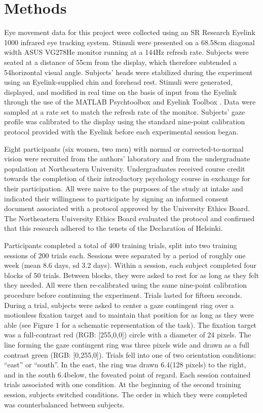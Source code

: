 \section{Methods}
Eye movement data for this project were collected using an SR Research Eyelink 1000 infrared eye tracking system. Stimuli were presented on a 68.58cm diagonal width ASUS VG278He monitor running at a 144Hz refresh rate. Subjects were seated at a distance of 55cm from the display, which therefore subtended a 54\degree horizontal visual angle. Subjects' heads were stabilized during the experiment using an Eyelink-supplied chin and forehead rest. Stimuli were generated, displayed, and modified in real time on the basis of input from the Eyelink through the use of the MATLAB Psychtoolbox \citep{brainard_1997} and Eyelink Toolbox \citep{cornelissen_2002}. Data were sampled at a rate set to match the refresh rate of the monitor. Subjects' gaze profile was calibrated to the display using the standard nine-point calibration protocol provided with the Eyelink before each experimental session began. 

Eight participants (six women, two men) with normal or corrected-to-normal vision were recruited from the authors' laboratory and from the undergraduate population at Northeastern University. Undergraduates received course credit towards the completion of their introductory psychology course in exchange for their participation. All were naive to the purposes of the study at intake and indicated their willingness to participate by signing an informed consent document associated with a protocol approved by the University Ethics Board. The Northeastern University Ethics Board evaluated the protocol and confirmed that this research adhered to the tenets of the Declaration of Helsinki.

Participants completed a total of 400 training trials, split into two training sessions of 200 trials each. Sessions were separated by a period of roughly one week (mean 8.6 days, sd 3.2 days). Within a session, each subject completed four blocks of 50 trials. Between blocks, they were asked to rest for as long as they felt they needed. All were then re-calibrated using the same nine-point calibration procedure before continuing the experiment. Trials lasted for fifteen seconds. During a trial, subjects were asked to center a gaze contingent ring over a motionless fixation target and to maintain that position for as long as they were able (see Figure 1 for a schematic representation of the task). The fixation target was a full-contrast red (RGB: [255,0,0]) circle with a diameter of 24 pixels. The line forming the gaze contingent ring was three pixels wide and drawn as a full contrast green (RGB: [0,255,0]). Trials fell into one of two orientation conditions: ``east'' or ``south''. In the east, the ring was drawn 6.4\degree (128 pixels) to the right, and in the south 6.4\degree below, the foveated point of regard. Each session contained trials associated with one condition. At the beginning of the second training session, subjects switched conditions. The order in which they were completed was counterbalanced between subjects.

